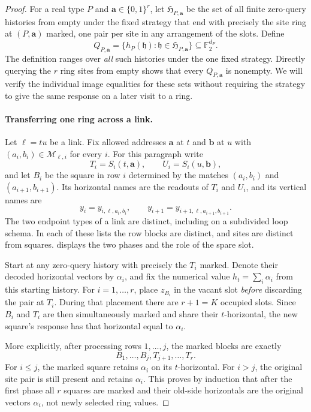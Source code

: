 \documentclass[11pt]{article}
\theoremstyle{definition}
\begin{document}
\begin{proof}
For a real type $P$ and $\mathbf a\in\{0,1\}^r$, let
$\mathfrak H_{P,\mathbf a}$ be the set of all finite zero-query histories
from empty under the fixed strategy that end with precisely the site ring
at $(P,\mathbf a)$ marked, one pair per site in any arrangement of the
slots.  Define
\begin{equation}
\label{uniform:attained-sets}
 Q_{P,\mathbf a}
 =\{h_P(\mathfrak h):\mathfrak h\in\mathfrak H_{P,\mathbf a}\}
 \subseteq\mathbb F_2^{d_P}.
\end{equation}
The definition ranges over \emph{all} such histories under the one fixed
strategy.  Directly querying the $r$ ring sites from empty shows that
every $Q_{P,\mathbf a}$ is nonempty.  We will verify the individual image
equalities for these sets without requiring the strategy to give the same
response on a later visit to a ring.

\paragraph{Transferring one ring across a link.}
Let $\ell=tu$ be a link.  Fix allowed addresses $\mathbf a$ at $t$ and
$\mathbf b$ at $u$ with
$(a_i,b_i)\in\mathcal M_{\ell,i}$ for every $i$.  For this paragraph write
\[
 T_i=S_i(t,\mathbf a),\qquad U_i=S_i(u,\mathbf b),
\]
and let $B_i$ be the square in row $i$ determined by the matches
$(a_i,b_i)$ and $(a_{i+1},b_{i+1})$.  Its horizontal names are the readouts
of $T_i$ and $U_i$, and its vertical names are
\[
 y_i=y_{i,\ell,a_i,b_i},\qquad
 y_{i+1}=y_{i+1,\ell,a_{i+1},b_{i+1}}.
\]
The two endpoint types of a link are distinct, including on a subdivided
loop schema.  In each of these lists the row blocks are distinct, and sites
are distinct from squares.
 displays the two phases and the role of
the spare slot.

Start at any zero-query history with precisely the $T_i$ marked.  Denote
their decoded horizontal vectors by $\alpha_i$, and fix the numerical
value $h_t=\sum_i\alpha_i$ from this starting history.  For
$i=1,\ldots,r$, place $z_{B_i}$ in the vacant slot \emph{before}
discarding the pair at $T_i$.  During that placement there are $r+1=K$
occupied slots.  Since $B_i$ and $T_i$ are then simultaneously marked and
share their $t$-horizontal, the new square's response has that horizontal
equal to $\alpha_i$.

More explicitly, after processing rows $1,\ldots,j$, the marked blocks are
exactly
\[
 B_1,\ldots,B_j,T_{j+1},\ldots,T_r.
\]
For $i\leq j$, the marked square retains $\alpha_i$ on its
$t$-horizontal.  For $i>j$, the original site pair is still present and
retains $\alpha_i$.  This proves by induction that after the first phase
all $r$ squares are marked and their old-side horizontals are the original
vectors $\alpha_i$, not newly selected ring values.


\end{proof}
\end{document}
